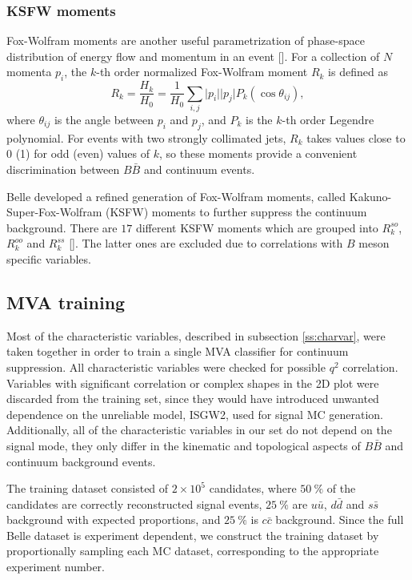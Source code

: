 \documentclass[  headings=standardclasses,
  headings=big,oneside,a4paper,openany,12pt]{scrbook}
\newcommand {\E}[1]{\times 10^{#1}}
\begin{document}
\subsubsection{KSFW moments}
Fox-Wolfram moments are another useful parametrization of phase-space distribution of energy flow and momentum in an event []. For a collection of $N$ momenta $p_i$, the $k$-th order normalized Fox-Wolfram moment $R_k$ is defined as
\begin{equation}
R_k = \frac{H_k}{H_0} = \frac{1}{H_0} \sum_{i,j} \vert p_i \vert \vert p_j \vert P_k(\cos \theta_{ij}),
\end{equation}
where $\theta_{ij}$ is the angle between $p_i$ and $p_j$, and $P_k$ is the $k$-th order Legendre polynomial. For events with two strongly collimated jets, $R_k$ takes values close to 0 (1) for odd (even) values of $k$, so these moments provide a convenient discrimination between $B \bar B$ and continuum events.

Belle developed a refined generation of Fox-Wolfram moments, called Kakuno-Super-Fox-Wolfram (KSFW) moments to further suppress the continuum background. There are $17$  different KSFW moments which are grouped into $R^{so}_k$, $R^{oo}_k$ and $R^{ss}_k$ []. The latter ones are excluded due to correlations with $B$ meson specific variables.

\subsection{MVA training}
\label{ss:qqmva}
Most of the characteristic variables, described in subsection \ref{ss:charvar}, were taken together in order to train a single MVA classifier for continuum suppression. All characteristic variables were checked for possible $q^2$ correlation. Variables with significant correlation or complex shapes in the 2D plot were discarded from the training set, since they would have introduced unwanted dependence on the unreliable model, ISGW2, used for signal MC generation. Additionally, all of the characteristic variables in our set do not depend on the signal mode, they only differ in the kinematic and topological aspects of $B \bar B$ and continuum background events.

The training dataset consisted of $2\E5$ candidates, where $50~\%$ of the candidates are correctly reconstructed signal events, $25~\%$ are $u \bar u$, $d \bar d$ and $s \bar s$ background with expected proportions, and $25~\%$ is $c \bar c$ background. Since the full Belle dataset is experiment dependent, we construct the training dataset by proportionally sampling each MC dataset, corresponding to the appropriate experiment number.
\end{document}

